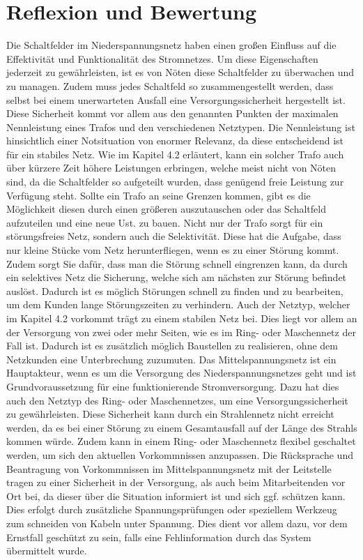 \section {Reflexion und Bewertung}

Die Schaltfelder im Niederspannungsnetz haben einen großen Einfluss auf die Effektivität und Funktionalität des Stromnetzes. Um diese Eigenschaften jederzeit 
zu gewährleisten, ist es von Nöten diese Schaltfelder zu überwachen und zu managen. Zudem muss jedes Schaltfeld so zusammengestellt werden, dass selbst bei 
einem unerwarteten Ausfall eine Versorgungssicherheit hergestellt ist. Diese Sicherheit kommt vor allem aus den genannten Punkten der maximalen Nennleistung 
eines Trafos und den verschiedenen Netztypen. Die Nennleistung ist hinsichtlich einer Notsituation von enormer Relevanz, da diese entscheidend ist für ein 
stabiles Netz. Wie im Kapitel 4.2 erläutert, kann ein solcher Trafo auch über kürzere Zeit höhere Leistungen erbringen, welche meist nicht von Nöten sind, 
da die Schaltfelder so aufgeteilt wurden, dass genügend freie Leistung zur Verfügung steht. Sollte ein Trafo an seine Grenzen kommen, gibt es die Möglichkeit 
diesen durch einen größeren auszutauschen oder das Schaltfeld aufzuteilen und eine neue Ust. zu bauen. Nicht nur der Trafo sorgt für ein störungsfreies Netz, 
sondern auch die Selektivität. Diese hat die Aufgabe, dass nur kleine Stücke vom Netz herunterfliegen, wenn es zu einer Störung kommt. Zudem sorgt Sie dafür, 
dass man die Störung schnell eingrenzen kann, da durch ein selektives Netz die Sicherung, welche sich am nächsten zur Störung befindet auslöst. Dadurch ist
es möglich Störungen schnell zu finden und zu bearbeiten, um dem Kunden lange Störungszeiten zu verhindern. Auch der Netztyp, welcher im Kapitel 4.2 
vorkommt trägt zu einem stabilen Netz bei. Dies liegt vor allem an der Versorgung von zwei oder mehr Seiten, wie es im Ring- oder Maschennetz der Fall 
ist. Dadurch ist es zusätzlich möglich Baustellen zu realisieren, ohne dem Netzkunden eine Unterbrechung zuzumuten. Das Mittelspannungsnetz ist ein 
Hauptakteur, wenn es um die Versorgung des Niederspannungsnetzes geht und ist Grundvoraussetzung für eine funktionierende Stromversorgung. Dazu hat dies 
auch den Netztyp des Ring- oder Maschennetzes, um eine Versorgungssicherheit zu gewährleisten. Diese Sicherheit kann durch ein Strahlennetz nicht erreicht
werden, da es bei einer Störung zu einem Gesamtausfall auf der Länge des Strahls kommen würde. Zudem kann in einem Ring- oder Maschennetz flexibel 
geschaltet werden, um sich den aktuellen Vorkommnissen anzupassen. Die Rücksprache und Beantragung von Vorkommnissen im Mittelspannungsnetz mit der 
Leitstelle tragen zu einer Sicherheit in der Versorgung, als auch beim Mitarbeitenden vor Ort bei, da dieser über die Situation informiert ist und sich
ggf. schützen kann. Dies erfolgt \zB durch zusätzliche Spannungsprüfungen oder speziellem Werkzeug zum schneiden von Kabeln unter Spannung. Dies dient 
vor allem dazu, vor dem Ernstfall geschützt zu sein, falls eine Fehlinformation durch das System übermittelt wurde.  

\clearpage
